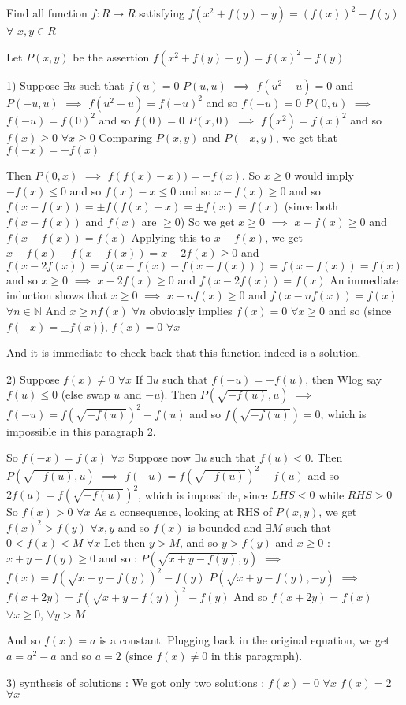 \begin{solution}
	\begin{tcolorbox}Find all function $ f: R \to R$ satisfying  $ f(x^2 + f(y) - y) = (f(x))^2 - f(y)$ $ \forall$ $ x,y \in R$\end{tcolorbox}

Let $ P(x,y)$ be the assertion $ f(x^2+f(y)-y)=f(x)^2-f(y)$

1) Suppose $ \exists u$ such that $ f(u)=0$
$ P(u,u)$ $ \implies$ $ f(u^2-u)=0$ and $ P(-u,u)$ $ \implies$ $ f(u^2-u)=f(-u)^2$ and so $ f(-u)=0$
$ P(0,u)$ $ \implies$ $ f(-u)=f(0)^2$ and so $ f(0)=0$
$ P(x,0)$ $ \implies$ $ f(x^2)=f(x)^2$ and so $ f(x)\geq 0$ $ \forall x\geq 0$
Comparing $ P(x,y)$ and $ P(-x,y)$, we get that $ f(-x)=\pm  f(x)$

Then $ P(0,x)$ $ \implies$ $ f(f(x)-x))=-f(x)$. So $ x\geq 0$ would imply $ -f(x)\leq 0$ and so $ f(x)-x\leq 0$ and so $ x-f(x)\geq 0$ and so $ f(x-f(x))=\pm f(f(x)-x)=\pm f(x)=f(x)$ (since both $ f(x-f(x))$ and $ f(x)$ are $ \geq 0$)
So we get $ x\geq 0$ $ \implies$ $ x-f(x)\geq 0$ and $ f(x-f(x))=f(x)$
Applying this to $ x-f(x)$, we get $ x-f(x)-f(x-f(x))=x-2f(x)\geq 0$ and $ f(x-2f(x))=f(x-f(x)-f(x-f(x)))=f(x-f(x))=f(x)$ and so $ x\geq 0$ $ \implies$ $ x-2f(x)\geq 0$ and $ f(x-2f(x))=f(x)$
An immediate induction shows that $ x\geq 0$ $ \implies$ $ x-nf(x)\geq 0$ and $ f(x-nf(x))=f(x)$ $ \forall n\in\mathbb N$
And $ x\geq nf(x)$ $ \forall n$ obviously implies $ f(x)=0$ $ \forall x\geq 0$ and so (since $ f(-x)=\pm f(x)$), $ f(x)=0$ $ \forall x$

And it is immediate to check back that this function indeed is a solution.

2) Suppose $ f(x)\neq 0$ $ \forall x$
If $ \exists u$ such that $ f(-u)=-f(u)$, then Wlog say $ f(u)\leq 0$ (else swap $ u$ and $ -u$). Then $ P(\sqrt{-f(u)},u)$ $ \implies$ $ f(-u)=f(\sqrt{-f(u)})^2-f(u)$ and so $ f(\sqrt{-f(u)})=0$, which is impossible in this paragraph 2.

So $ f(-x)=f(x)$ $ \forall x$
Suppose now $ \exists u$ such that $ f(u)<0$. Then $ P(\sqrt{-f(u)},u)$ $ \implies$ $ f(-u)=f(\sqrt{-f(u)})^2-f(u)$ and so $ 2f(u)=f(\sqrt{-f(u)})^2$, which is impossible, since $ LHS<0$ while $ RHS>0$
So $ f(x)>0$ $ \forall x$
As a consequence, looking at RHS of $ P(x,y)$, we get $ f(x)^2>f(y)$ $ \forall x,y$ and so $ f(x)$ is bounded and $ \exists M$ such that $ 0<f(x)<M$ $ \forall x$
Let then $ y>M$, and so $ y>f(y)$ and $ x\geq 0$ : $ x+y-f(y)\geq 0$ and so :
$ P(\sqrt{x+y-f(y)},y)$ $ \implies$ $ f(x)=f(\sqrt{x+y-f(y)})^2-f(y)$
$ P(\sqrt{x+y-f(y)},-y)$ $ \implies$ $ f(x+2y)=f(\sqrt{x+y-f(y)})^2-f(y)$
And so $ f(x+2y)=f(x)$ $ \forall x\geq 0$, $ \forall y>M$

And so $ f(x)=a$ is a constant.
Plugging back in the original equation, we get $ a=a^2-a$ and so $ a=2$ (since $ f(x)\neq 0$ in this paragraph).

3) synthesis of solutions :
We got only two solutions :
$ f(x)=0$ $ \forall x$
$ f(x)=2$ $ \forall x$
\end{solution}



